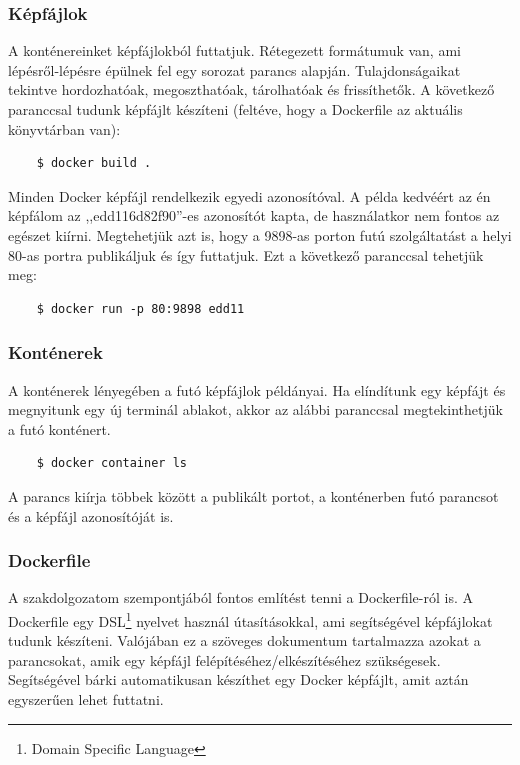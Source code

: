 \documentclass{thesis-ekf}
\theoremstyle{definition}
\theoremstyle{remark}
\begin{document}
\subsubsection{Képfájlok}

A konténereinket képfájlokból futtatjuk.
Rétegezett formátumuk van, ami lépésről-lépésre épülnek fel egy sorozat parancs alapján.
Tulajdonságaikat tekintve hordozhatóak, megoszthatóak, tárolhatóak és frissíthetők.
A következő paranccsal tudunk képfájlt készíteni (feltéve, hogy a Dockerfile az aktuális könyvtárban van):

\begin{verbatim}
	$ docker build .
\end{verbatim}

Minden Docker képfájl rendelkezik egyedi azonosítóval.
A példa kedvéért az én képfálom az ,,edd116d82f90''-es azonosítót kapta, de használatkor nem fontos az egészet kiírni.
Megtehetjük azt is, hogy a 9898-as porton futú szolgáltatást a helyi 80-as portra publikáljuk és így futtatjuk.
Ezt a következő paranccsal tehetjük meg:

\begin{verbatim}
	$ docker run -p 80:9898 edd11
\end{verbatim}

\subsubsection{Konténerek}

A konténerek lényegében a futó képfájlok példányai.
Ha elíndítunk egy képfájt és megnyitunk egy új terminál ablakot, akkor az alábbi paranccsal megtekinthetjük a futó konténert.

\begin{verbatim}
	$ docker container ls
\end{verbatim}

A parancs kiírja többek között a publikált portot, a konténerben futó parancsot és a képfájl azonosítóját is.

\subsubsection{Dockerfile}

A szakdolgozatom szempontjából fontos említést tenni a Dockerfile-ról is.
A Dockerfile egy DSL\footnote{Domain Specific Language} nyelvet használ útasításokkal, ami segítségével képfájlokat tudunk készíteni.
Valójában ez a szöveges dokumentum tartalmazza azokat a parancsokat, amik egy képfájl felépítéséhez/elkészítéséhez szükségesek.
Segítségével bárki automatikusan készíthet egy Docker képfájlt, amit aztán egyszerűen lehet futtatni.
\end{document}
